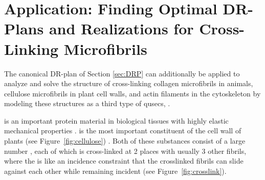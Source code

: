 \section{Application: Finding Optimal DR-Plans and Realizations for Cross-Linking Microfibrils}
\label{sec:pinnedline}

The canonical DR-plan of Section \ref{sec:DRP} can additionally be applied to analyze and solve the structure of cross-linking collagen microfibrils in animals, cellulose microfibrils in plant cell walls, and actin filaments in the cytoskeleton by modeling these structures as a third type of qusecs, .


 is an important protein material in biological tissues with highly elastic mechanical properties \cite{buehler2008nanomechanics}.  is the most important constituent of the cell wall of plants (see Figure~\ref{fig:cellulose}) \cite{fall2013physical,smith1971plant}. Both of these substances consist of a large number ,
each of which is cross-linked at 2 places with usually 3 other fibrils, where the  is like an incidence constraint that the crosslinked fibrils can slide against each other while remaining incident (see Figure~\ref{fig:crosslink}).

%
%
%
%
%
%





